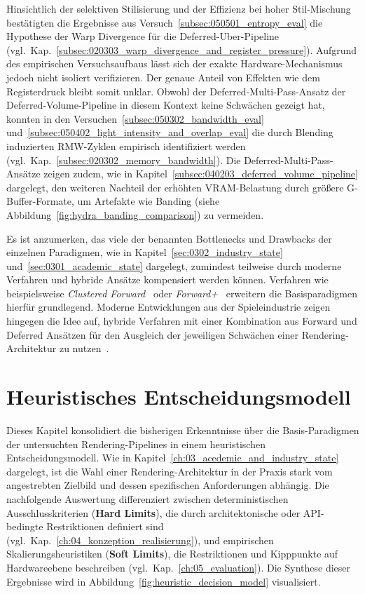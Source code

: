 Hinsichtlich der selektiven Stilisierung und der Effizienz bei hoher Stil-Mischung bestätigten die Ergebnisse aus
Versuch~\ref{subsec:050501_entropy_eval} die Hypothese der Warp Divergence für die Deferred-Uber-Pipeline
(vgl.\ Kap.~\ref{subsec:020303_warp_divergence_and_register_pressure}).
Aufgrund des empirischen Versuchsaufbaus lässt sich der exakte Hardware-Mechanismus jedoch nicht isoliert verifizieren.
Der genaue Anteil von Effekten wie dem Registerdruck bleibt somit unklar.
Obwohl der Deferred-Multi-Pass-Ansatz der Deferred-Volume-Pipeline in diesem Kontext keine Schwächen gezeigt hat,
konnten in den Versuchen~\ref{subsec:050302_bandwidth_eval} und~\ref{subsec:050402_light_intensity_and_overlap_eval} die
durch Blending induzierten \ac{RMW}-Zyklen empirisch identifiziert werden
(vgl.\ Kap.~\ref{subsec:020302_memory_bandwidth}).
Die Deferred-Multi-Pass-Ansätze zeigen zudem, wie in Kapitel~\ref{subsec:040203_deferred_volume_pipeline} dargelegt, den
weiteren Nachteil der erhöhten \ac{VRAM}-Belastung durch größere G-Buffer-Formate, um Artefakte wie Banding (siehe
Abbildung~\ref{fig:hydra_banding_comparison}) zu vermeiden.

Es ist anzumerken, das viele der benannten Bottlenecks und Drawbacks der einzelnen Paradigmen, wie in
Kapitel~\ref{sec:0302_industry_state} und~\ref{sec:0301_academic_state} dargelegt, zumindest teilweise durch moderne
Verfahren und hybride Ansätze kompensiert werden können.
Verfahren wie beispielsweise \textit{Clustered Forward}~\parencite[vgl.][]{olssonClusteredDeferredForward2012} oder
\textit{Forward+}~\parencite[vgl.][]{haradaForwardBringingDeferred2012} erweitern die
Basisparadigmen hierfür grundlegend.
Moderne Entwicklungen aus der Spieleindustrie zeigen hingegen die Idee auf, hybride Verfahren mit einer Kombination aus
Forward und Deferred Ansätzen für den Ausgleich der jeweiligen Schwächen einer Rendering-Architektur zu
nutzen~\parencite[vgl.][]{muhammadPrettyFramesPRAGMATA2026, gameworksToonRenderingHiFi, valientDeferredRenderingKillzone}.


\section{Heuristisches Entscheidungsmodell}
\label{sec:0602_heuristic_model}

Dieses Kapitel konsolidiert die bisherigen Erkenntnisse über die Basis-Paradigmen der untersuchten Rendering-Pipelines
in einem heuristischen Entscheidungsmodell.
Wie in Kapitel~\ref{ch:03_acedemic_and_industry_state} dargelegt, ist die Wahl einer Rendering-Architektur in der Praxis
stark vom angestrebten Zielbild und dessen spezifischen Anforderungen
abhängig.
Die nachfolgende Auswertung differenziert zwischen deterministischen Ausschlusskriterien (\textbf{Hard Limits}), die
durch architektonische oder \ac{API}-bedingte Restriktionen definiert sind
(vgl.\ Kap.~\ref{ch:04_konzeption_realisierung}), und empirischen Skalierungsheuristiken (\textbf{Soft Limits}), die
Restriktionen und Kipppunkte auf Hardwareebene beschreiben (vgl.\ Kap.~\ref{ch:05_evaluation}).
Die Synthese dieser Ergebnisse wird in Abbildung~\ref{fig:heuristic_decision_model} visualisiert.

